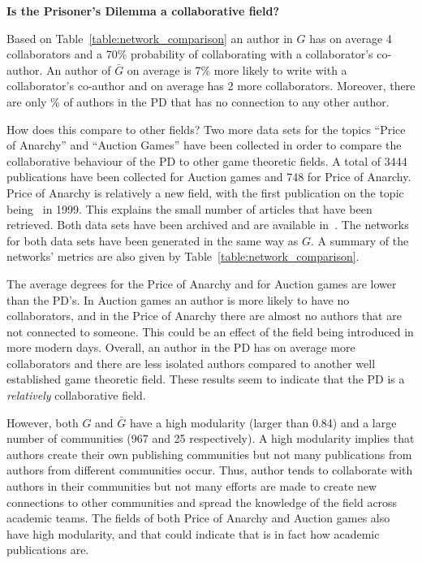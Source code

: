 \documentclass{article}
\theoremstyle{definition}
\newcommand{\isolatedpercentage}{}
\begin{document}
\textbf{Is the Prisoner's Dilemma a collaborative field?}

Based on Table~\ref{table:network_comparison} an author in \(G\) has on
average 4 collaborators and a 70\% probability of collaborating with a
collaborator's co-author. An author of \(\bar{G}\) on average is 7\% more likely
to write with a collaborator's co-author and on average has 2 more
collaborators. Moreover, there are only \isolatedpercentage\% of authors in the
PD that has no connection to any other author.

How does this compare to other fields? Two more data sets for the topics
``Price of Anarchy'' and ``Auction Games'' have been collected in order to
compare the collaborative behaviour of the PD to other game theoretic fields. A
total of 3444 publications have been collected for Auction games and 748 for
Price of Anarchy. Price of Anarchy is relatively a new field, with the first
publication on the topic being~\cite{Koutsoupias1999} in 1999. This explains the
small number of articles that have been retrieved. Both data sets have been
archived and are available in~\cite{auction_data_2018, anarchy_data_2018}.
The networks for both data sets have been generated in the same way as \(G\).
A summary of the networks' metrics are also given by Table~\ref{table:network_comparison}.

The average degrees for the Price of Anarchy and for Auction games are lower
than the PD's. In Auction games an author is more likely to have no collaborators,
and in the Price of Anarchy there are almost no authors that are not connected
to someone. This could be an effect of the field being introduced in more modern
days. Overall, an author in the PD has on average more collaborators
and there are less isolated authors compared to another well established game
theoretic field. These results seem to indicate that the PD is a \textit{relatively} collaborative
field.

However, both \(G\) and \(\bar{G}\) have a high modularity (larger than 0.84) and a large number of
communities (967 and 25 respectively). A high modularity implies that authors create their own publishing
communities but not many publications from authors from different communities
occur. Thus, author tends to collaborate with authors in their communities but
not many efforts are made to create new connections to other communities and
spread the knowledge of the field across academic teams. The fields
of both Price of Anarchy and Auction games also have high modularity, and
that could indicate that is in fact how academic publications are.
\end{document}
